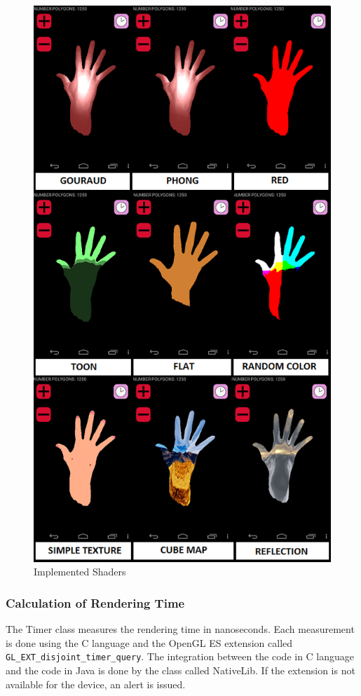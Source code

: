 \documentclass[10pt, conference, compsocconf]{IEEEtran}
\begin{document}
	\begin{figure}[!t]
	\centering
		\includegraphics[keepaspectratio=true,scale=0.4]{shaders_impl.png}
	\caption{Implemented Shaders}
	\label{shaders_impl}
	\end{figure}

\subsubsection{Calculation of Rendering Time}
\label{time}
The Timer class measures the rendering time in nanoseconds. Each measurement is
done using the C language and the OpenGL ES extension called 
\texttt{GL\_EXT\_disjoint\_timer\_query}. The integration between the code in C 
language and the code in Java is done by the class called NativeLib. If the
extension is not available for the device, an alert is issued.
\end{document}
